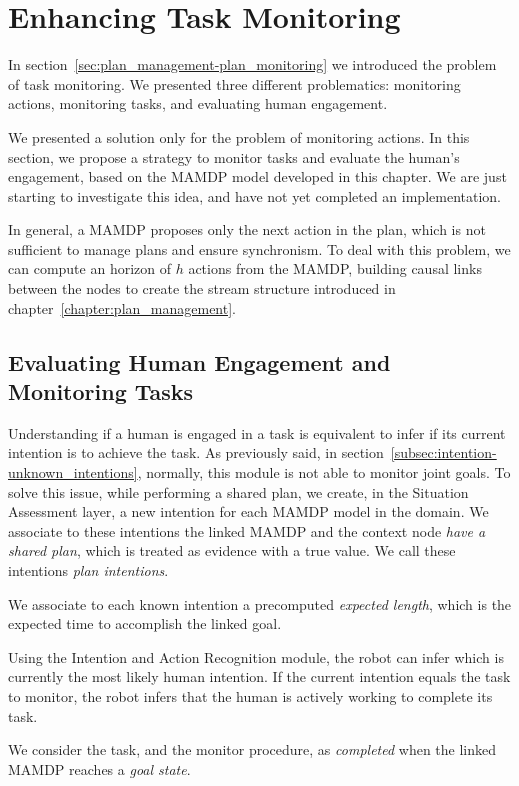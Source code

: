 \section{Enhancing Task Monitoring}
\label{sec:mamdp-plan_monitoring}

In section~\ref{sec:plan_management-plan_monitoring} we introduced the problem of task monitoring. We presented three different problematics: monitoring actions, monitoring tasks, and evaluating human engagement.

We presented a solution only for the problem of monitoring actions. In this section, we propose a strategy to monitor tasks and evaluate the human's engagement, based on the MAMDP model developed in this chapter. We are just starting to investigate this idea, and have not yet completed an implementation.

In general, a MAMDP proposes only the next action in the plan, which is not sufficient to manage plans and ensure synchronism. To deal with this problem, we can compute an horizon of $h$ actions from the MAMDP, building causal links between the nodes to create the stream structure introduced in chapter~\ref{chapter:plan_management}.

\subsection{Evaluating Human Engagement and Monitoring Tasks}
Understanding if a human is engaged in a task is equivalent to infer if its current intention is to achieve the task. As previously said, in section~\ref{subsec:intention-unknown_intentions}, normally, this module is not able to monitor joint goals. To solve this issue, while performing a shared plan, we create, in the Situation Assessment layer, a new intention for each MAMDP model in the domain. We associate to these intentions the linked MAMDP and the context node \textit{have a shared plan}, which is treated as evidence with a true value. We call these intentions \textit{plan intentions}.

We associate to each known intention a precomputed \textit{expected length}, which is the expected time to accomplish the linked goal.

Using the Intention and Action Recognition module, the robot can infer which is currently the most likely human intention. If the current intention equals the task to monitor, the robot infers that the human is actively working to complete its task.

 We consider the task, and the monitor procedure, as \textit{completed} when the linked MAMDP reaches a \textit{goal state}.

